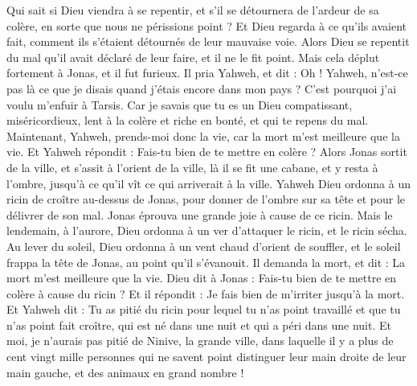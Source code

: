 \begin{multicols}{2}
Qui sait si Dieu viendra à se repentir, et s'il se détournera de l'ardeur de sa colère, en sorte que nous ne périssions point ?
Et Dieu regarda à ce qu'ils avaient fait, comment ils s'étaient détournés de leur mauvaise voie. Alors Dieu se repentit du mal qu'il avait déclaré de leur faire, et il ne le fit point.
\VerseOne{}Mais cela déplut fortement à Jonas, et il fut furieux.
Il pria Yahweh, et dit : Oh ! Yahweh, n'est-ce pas là ce que je disais quand j'étais encore dans mon pays ? C'est pourquoi j'ai voulu m'enfuir à Tarsis. Car je savais que tu es un Dieu compatissant, miséricordieux, lent à la colère et riche en bonté, et qui te repens du mal.
Maintenant, Yahweh, prends-moi donc la vie, car la mort m'est meilleure que la vie.
Et Yahweh répondit : Fais-tu bien de te mettre en colère ?
Alors Jonas sortit de la ville, et s'assit à l'orient de la ville, là il se fit une cabane, et y resta à l'ombre, jusqu'à ce qu'il vît ce qui arriverait à la ville.
Yahweh Dieu ordonna à un ricin de croître au-dessus de Jonas, pour donner de l’ombre sur sa tête et pour le délivrer de son mal. Jonas éprouva une grande joie à cause de ce ricin.
Mais le lendemain, à l’aurore, Dieu ordonna à un ver d’attaquer le ricin, et le ricin sécha.
Au lever du soleil, Dieu ordonna à un vent chaud d’orient de souffler, et le soleil frappa la tête de Jonas, au point qu’il s’évanouit. Il demanda la mort, et dit : La mort m'est meilleure que la vie.
Dieu dit à Jonas : Fais-tu bien de te mettre en colère à cause du ricin ? Et il répondit : Je fais bien de m’irriter jusqu’à la mort.
Et Yahweh dit : Tu as pitié du ricin pour lequel tu n'as point travaillé et que tu n'as point fait croître, qui est né dans une nuit et qui a péri dans une nuit.
Et moi, je n’aurais pas pitié de Ninive, la grande ville, dans laquelle il y a plus de cent vingt mille personnes qui ne savent point distinguer leur main droite de leur main gauche, et des animaux en grand nombre !
\PPE{}
\end{multicols}
